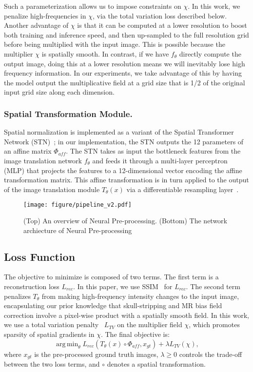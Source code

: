 \documentclass[runningheads]{llncs}
\DeclareMathOperator*{\argmin}{arg\,min}
\begin{document}
Such a parameterization allows us to impose constraints on $\chi$. In this work, we penalize high-frequencies in $\chi$, via the total variation loss described below.  
Another advantage of $\chi$ is that it can be computed at a lower resolution to boost both training and inference speed, and then up-sampled to the full resolution grid before being multiplied with the input image. 
This is possible because the multiplier $\chi$ is spatially smooth. 
In contrast, if we have $f_\theta$ directly compute the output image, doing this at a lower resolution means we will inevitably lose high frequency information. 
In our experiments, we take advantage of this by having the model output the multiplicative field at a grid size that is 1/2 of the original input grid size along each dimension. 

\subsubsection{Spatial Transformation Module.}
Spatial normalization is implemented as a variant of the Spatial Transformer Network (STN)~\cite{jaderberg2015spatial}; in our implementation, the STN outputs the 12 parameters of an affine matrix $\Phi_{aff}$. 
The STN takes as input the bottleneck features from the image translation network $f_\theta$ and feeds it through a multi-layer perceptron (MLP) that projects the features to a 12-dimensional vector encoding the affine transformation matrix. This affine transformation is in turn applied to the output of the image translation module $T_\theta(x)$ via a differentiable resampling layer~\cite{jaderberg2015spatial}. 

\begin{figure}[t] 
\centering
\texttt{[image: figure/pipeline\_v2.pdf]} 
\caption{(Top) An overview of Neural Pre-processing. (Bottom) The network archiecture of Neural Pre-processing} \label{fig_p}
\end{figure}

\subsection{Loss Function}
\label{sec:loss}
The objective to minimize is composed of two terms.
The first term is a reconstruction loss $L_{rec}$. In this paper, we use SSIM~\cite{Wang2004} for $L_{rec}$.
The second term penalizes $T_\theta$ from making high-frequency intensity changes to the input image, encapsulating our prior knowledge that skull-stripping and MR bias field correction involve a pixel-wise product with a spatially smooth field.
In this work, we use a total variation penalty~\cite{Osher2005} $L_{TV}$ on the multiplier field $\chi$, which promotes sparsity of spatial gradients in $\chi$. The final objective is:
\begin{equation}
\argmin_\theta 
    L_{rec}(T_\theta(x) \circ \Phi_{aff}, x_{gt}) + \lambda L_{TV}(\chi),
\end{equation}
where $x_{gt}$ is the pre-processed ground truth images, $\lambda \geq 0$ controls the trade-off between the two loss terms, and $\circ$ denotes a spatial transformation.
\end{document}
